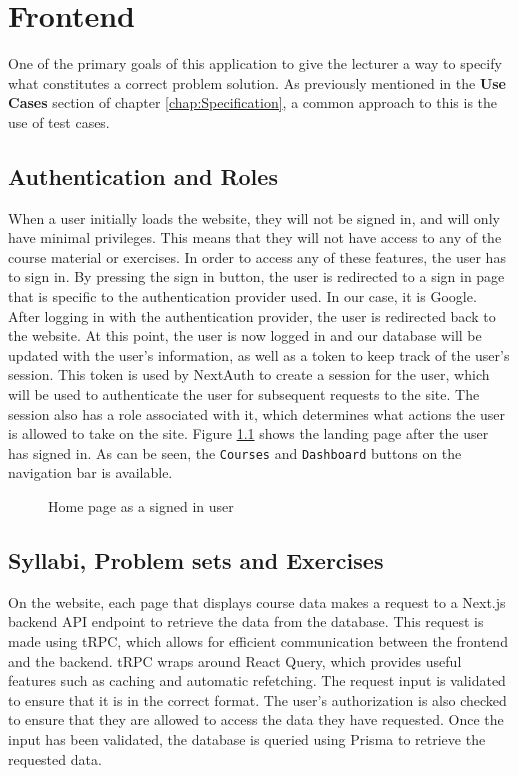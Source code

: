 \chapter{Frontend } \label{chap:Frontend} 
One of the primary goals of this application to give the lecturer a way to specify what constitutes a correct problem solution.
As previously mentioned in the \textbf{Use Cases} section of chapter \ref{chap:Specification}, a common approach to this is the use of test cases.

\section{Authentication and Roles}
When a user initially loads the website, they will not be signed in, and will only have minimal privileges.
This means that they will not have access to any of the course material or exercises.
In order to access any of these features, the user has to sign in.
By pressing the sign in button, the user is redirected to a sign in page that is specific to the authentication provider used.
In our case, it is Google.
After logging in with the authentication provider, the user is redirected back to the website.
At this point, the user is now logged in and our database will be updated with the user's information, as well as a token to keep track of the user's session.
This token is used by NextAuth to create a session for the user, which will be used to authenticate the user for subsequent requests to the site.
The session also has a role associated with it, which determines what actions the user is allowed to take on the site.
Figure \ref{fig:Home page} shows the landing page after the user has signed in. As can be seen, the \texttt{Courses} and \texttt{Dashboard} buttons on the navigation bar is available.
\begin{figure}[H]
    \centering
    \caption{Home page as a signed in user}
    \label{fig:Home page}
\end{figure}

\section{Syllabi, Problem sets and Exercises}
On the website, each page that displays course data makes a request to a Next.js backend API endpoint to retrieve the data from the database.
This request is made using tRPC, which allows for efficient communication between the frontend and the backend. tRPC wraps around React Query, which provides useful features such as caching and automatic refetching.
The request input is validated to ensure that it is in the correct format.
The user's authorization is also checked to ensure that they are allowed to access the data they have requested.
Once the input has been validated, the database is queried using Prisma to retrieve the requested data.

